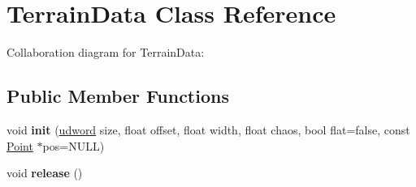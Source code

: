 \hypertarget{class_terrain_data}{\section{Terrain\+Data Class Reference}
\label{class_terrain_data}
}


Collaboration diagram for Terrain\+Data\+:
\subsection*{Public Member Functions}
\begin{DoxyCompactItemize}
\item 
\hypertarget{class_terrain_data_aaefed65bda43b9f7ff001861e862c308}{void {\bfseries init} (\hyperlink{_ice_types_8h_a44c6f1920ba5551225fb534f9d1a1733}{udword} size, float offset, float width, float chaos, bool flat=false, const \hyperlink{class_point}{Point} $\ast$pos=N\+U\+L\+L)}\label{class_terrain_data_aaefed65bda43b9f7ff001861e862c308}

\item 
\hypertarget{class_terrain_data_a39cb9e033c2f8bfb8ffef3897cd617b4}{void {\bfseries release} ()}\label{class_terrain_data_a39cb9e033c2f8bfb8ffef3897cd617b4}

\end{DoxyCompactItemize}

